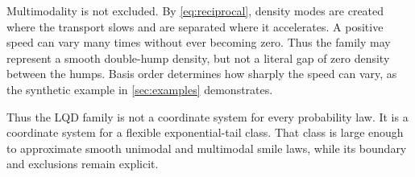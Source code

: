 Multimodality is not excluded.  By \eqref{eq:reciprocal}, density modes are
created where the transport slows and are separated where it accelerates.
A positive speed can vary many times without ever becoming zero.  Thus the
family may represent a smooth double-hump density, but not a literal gap of
zero density between the humps.  Basis order determines how sharply the speed
can vary, as the synthetic example in \cref{sec:examples} demonstrates.

Thus the LQD family is not a coordinate system for every probability law.  It
is a coordinate system for a flexible exponential-tail class.  That class is
large enough to approximate smooth unimodal and multimodal smile laws, while
its boundary and exclusions remain explicit.
